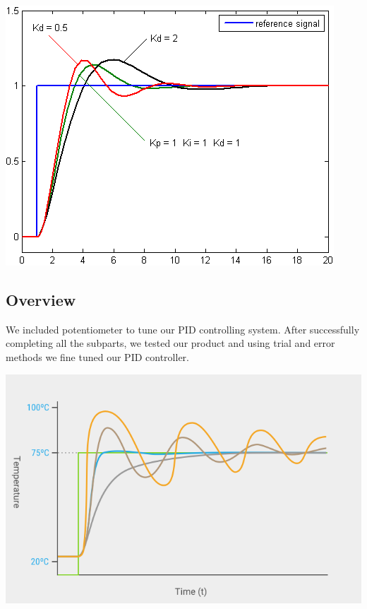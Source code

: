 \begin{multicols}{2}
\begin{minipage}{0.45\textwidth}
\centering
\includegraphics[width=\textwidth]{PID/Change_with_Kd.png}
\end{minipage}

\subsection*{Overview}
We included potentiometer to tune our PID controlling system. After successfully completing all the subparts, we tested our product and using trial and error methods we fine tuned our PID controller.

\begin{minipage}{0.45\textwidth}
\centering
\includegraphics[width=\textwidth]{PID/PID_Master_Graph.png}
\end{minipage}


\end{multicols}
